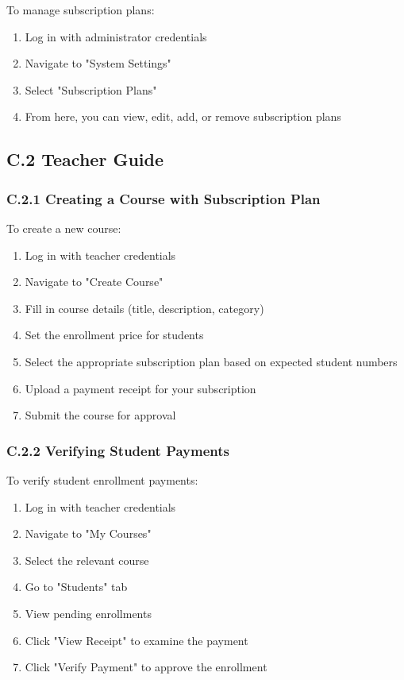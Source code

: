 To manage subscription plans:

\begin{enumerate}
    \item Log in with administrator credentials
    \item Navigate to "System Settings"
    \item Select "Subscription Plans"
    \item From here, you can view, edit, add, or remove subscription plans
\end{enumerate}

\subsection*{C.2 Teacher Guide}

\subsubsection*{C.2.1 Creating a Course with Subscription Plan}

To create a new course:

\begin{enumerate}
    \item Log in with teacher credentials
    \item Navigate to "Create Course"
    \item Fill in course details (title, description, category)
    \item Set the enrollment price for students
    \item Select the appropriate subscription plan based on expected student numbers
    \item Upload a payment receipt for your subscription
    \item Submit the course for approval
\end{enumerate}

\subsubsection*{C.2.2 Verifying Student Payments}

To verify student enrollment payments:

\begin{enumerate}
    \item Log in with teacher credentials
    \item Navigate to "My Courses"
    \item Select the relevant course
    \item Go to "Students" tab
    \item View pending enrollments
    \item Click "View Receipt" to examine the payment
    \item Click "Verify Payment" to approve the enrollment
\end{enumerate}

